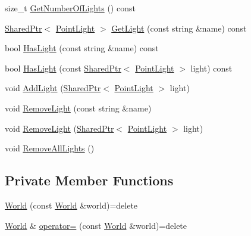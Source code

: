 \begin{DoxyCompactItemize}
\item 
size\+\_\+t \hyperlink{classmage_1_1_world_a786420d8d8b97065ee591753b7f1541b}{Get\+Number\+Of\+Lights} () const
\item 
\hyperlink{namespacemage_a1e01ae66713838a7a67d30e44c67703e}{Shared\+Ptr}$<$ \hyperlink{classmage_1_1_point_light}{Point\+Light} $>$ \hyperlink{classmage_1_1_world_ac7c1a382b10e67bd42493af3966c9212}{Get\+Light} (const string \&name) const
\item 
bool \hyperlink{classmage_1_1_world_af83318e3810a5658aa37285df708aa81}{Has\+Light} (const string \&name) const
\item 
bool \hyperlink{classmage_1_1_world_ac76eb3df75c68ec28b7a9db9b0576171}{Has\+Light} (const \hyperlink{namespacemage_a1e01ae66713838a7a67d30e44c67703e}{Shared\+Ptr}$<$ \hyperlink{classmage_1_1_point_light}{Point\+Light} $>$ light) const
\item 
void \hyperlink{classmage_1_1_world_ab0c31d3113ea264fed8b8ef034047c91}{Add\+Light} (\hyperlink{namespacemage_a1e01ae66713838a7a67d30e44c67703e}{Shared\+Ptr}$<$ \hyperlink{classmage_1_1_point_light}{Point\+Light} $>$ light)
\item 
void \hyperlink{classmage_1_1_world_a06f60650aa7992f44167043d1aa2e576}{Remove\+Light} (const string \&name)
\item 
void \hyperlink{classmage_1_1_world_ab2bca0a737500b2d78b39e6cbafd61d0}{Remove\+Light} (\hyperlink{namespacemage_a1e01ae66713838a7a67d30e44c67703e}{Shared\+Ptr}$<$ \hyperlink{classmage_1_1_point_light}{Point\+Light} $>$ light)
\item 
void \hyperlink{classmage_1_1_world_a5fafe529414d511e88b98ccd8e2f951f}{Remove\+All\+Lights} ()
\end{DoxyCompactItemize}
\subsection*{Private Member Functions}
\begin{DoxyCompactItemize}
\item 
\hyperlink{classmage_1_1_world_a28e20e33499cd57282cefa5ab0fda041}{World} (const \hyperlink{classmage_1_1_world}{World} \&world)=delete
\item 
\hyperlink{classmage_1_1_world}{World} \& \hyperlink{classmage_1_1_world_aa7074e3847c9fbe1466aa833f194eed0}{operator=} (const \hyperlink{classmage_1_1_world}{World} \&world)=delete
\end{DoxyCompactItemize}
